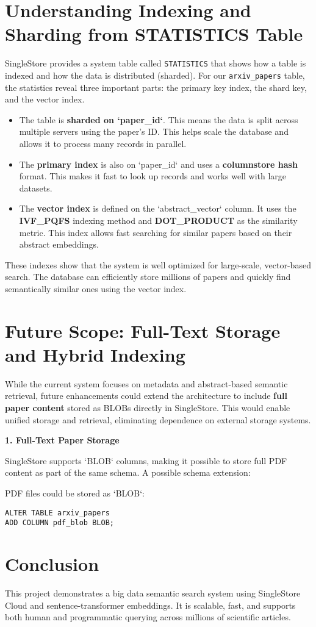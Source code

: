 \documentclass[11pt]{article}
\begin{document}
\section*{Understanding Indexing and Sharding from STATISTICS Table}
\label{sec:orgfab4ce2}

SingleStore provides a system table called \texttt{STATISTICS} that shows how a table is indexed and how the data is distributed (sharded). For our \texttt{arxiv\_papers} table, the statistics reveal three important parts: the primary key index, the shard key, and the vector index.

\begin{itemize}
\item The table is \textbf{sharded on `paper\_id`}. This means the data is split across multiple servers using the paper's ID. This helps scale the database and allows it to process many records in parallel.
\item The \textbf{primary index} is also on `paper\_id` and uses a \textbf{columnstore hash} format. This makes it fast to look up records and works well with large datasets.
\item The \textbf{vector index} is defined on the `abstract\_vector` column. It uses the \textbf{IVF\_PQFS} indexing method and \textbf{DOT\_PRODUCT} as the similarity metric. This index allows fast searching for similar papers based on their abstract embeddings.
\end{itemize}

These indexes show that the system is well optimized for large-scale, vector-based search. The database can efficiently store millions of papers and quickly find semantically similar ones using the vector index.
\section*{Future Scope: Full-Text Storage and Hybrid Indexing}
\label{sec:orgdeb274b}

While the current system focuses on metadata and abstract-based semantic retrieval, future enhancements could extend the architecture to include \textbf{full paper content} stored as BLOBs directly in SingleStore. This would enable unified storage and retrieval, eliminating dependence on external storage systems.

\textbf{\textbf{1. Full-Text Paper Storage}}

SingleStore supports `BLOB` columns, making it possible to store full PDF content as part of the same schema. A possible schema extension:

PDF files could be stored as `BLOB`:

\begin{verbatim}
ALTER TABLE arxiv_papers
ADD COLUMN pdf_blob BLOB;
\end{verbatim}
\section*{Conclusion}
\label{sec:org56c99bf}
This project demonstrates a big data semantic search system using SingleStore Cloud and sentence-transformer embeddings. It is scalable, fast, and supports both human and programmatic querying across millions of scientific articles.
\end{document}
